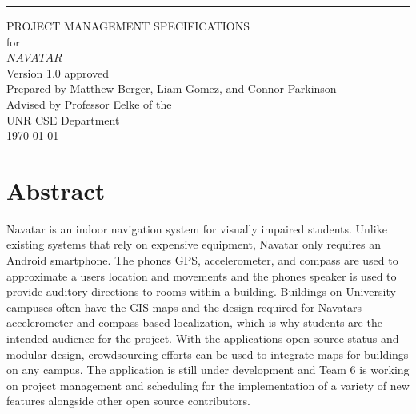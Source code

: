 \documentclass{scrreprt}
\date{}
\def\myversion{1.0 }
\begin{document}
\begin{flushright}
    \rule{16cm}{5pt}\vskip1cm
    \begin{bfseries}
        \Huge{PROJECT MANAGEMENT SPECIFICATIONS}\\
        \vspace{1.6cm}
        for\\
        \vspace{1.6cm}
        $NAVATAR$\\
        \vspace{1.6cm}
        \LARGE{Version \myversion approved}\\
        \vspace{1.6cm}
        Prepared by Matthew Berger, Liam Gomez, and Connor Parkinson\\ 
        \vspace{1.6cm}
        Advised by Professor Eelke of the\\UNR CSE Department\\
        \vspace{1.6cm}
        \today\\
    \end{bfseries}
\end{flushright}

\tableofcontents

\chapter{Abstract}
Navatar is an indoor navigation system for visually impaired students. Unlike existing systems that rely on expensive equipment, Navatar only requires an Android smartphone. The phone\textsc{}s GPS, accelerometer, and compass are used to approximate a user\textsc{}s location and movements and the phone\textsc{}s speaker is used to provide auditory directions to rooms within a building. Buildings on University campuses often have the GIS maps and the design required for Navatar\textsc{}s accelerometer and compass based localization, which is why students are the intended audience for the project. With the application\textsc{}s open source status and modular design, crowdsourcing efforts can be used to integrate maps for buildings on any campus. The application is still under development and Team 6 is working on project management and scheduling for the implementation of a variety of new features alongside other open source contributors.
\end{document}
